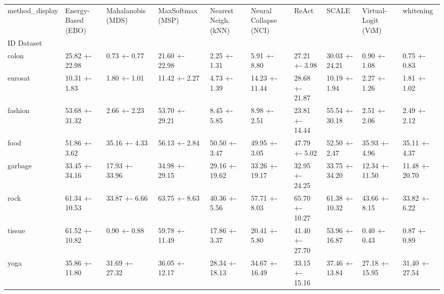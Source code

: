 \begin{tabular}{llllllllll}
\toprule
method_display & Energy-Based (EBO) & Mahalanobis (MDS) & MaxSoftmax (MSP) & Nearest Neigh. (kNN) & Neural Collapse (NCI) & ReAct & SCALE & Virtual-Logit (ViM) & whitening \\
ID Dataset &  &  &  &  &  &  &  &  &  \\
\midrule
colon & 25.82 +- 22.98 & 0.73 +- 0.77 & 21.60 +- 22.98 & 2.25 +- 1.31 & 5.91 +- 8.80 & 27.21 +- 3.98 & 30.03 +- 24.21 & 0.90 +- 1.08 & 0.75 +- 0.83 \\
eurosat & 10.31 +- 1.83 & 1.80 +- 1.01 & 11.42 +- 2.27 & 4.73 +- 1.39 & 14.23 +- 11.44 & 28.68 +- 21.87 & 10.19 +- 1.94 & 2.27 +- 1.26 & 1.81 +- 1.02 \\
fashion & 53.68 +- 31.32 & 2.66 +- 2.23 & 53.70 +- 29.21 & 8.45 +- 5.85 & 8.98 +- 2.51 & 23.81 +- 14.44 & 55.54 +- 30.18 & 2.51 +- 2.06 & 2.49 +- 2.12 \\
food & 51.86 +- 3.62 & 35.16 +- 4.33 & 56.13 +- 2.84 & 50.50 +- 3.47 & 49.95 +- 3.05 & 47.79 +- 5.02 & 52.50 +- 2.47 & 35.93 +- 4.96 & 35.11 +- 4.37 \\
garbage & 33.45 +- 34.16 & 17.93 +- 33.96 & 34.98 +- 29.15 & 29.16 +- 19.62 & 33.26 +- 19.17 & 32.95 +- 24.25 & 33.75 +- 34.20 & 12.34 +- 11.50 & 11.48 +- 20.70 \\
rock & 61.34 +- 10.53 & 33.87 +- 6.66 & 63.75 +- 8.63 & 40.36 +- 5.56 & 57.71 +- 8.03 & 65.70 +- 10.27 & 61.38 +- 10.32 & 43.66 +- 8.15 & 33.82 +- 6.22 \\
tissue & 61.52 +- 10.82 & 0.90 +- 0.88 & 59.78 +- 11.49 & 17.86 +- 3.37 & 20.41 +- 5.80 & 41.40 +- 27.70 & 53.96 +- 16.87 & 0.40 +- 0.43 & 0.87 +- 0.89 \\
yoga & 35.86 +- 11.80 & 31.69 +- 27.32 & 36.05 +- 12.17 & 28.34 +- 18.13 & 34.67 +- 16.49 & 33.15 +- 15.16 & 37.46 +- 13.84 & 27.18 +- 15.95 & 31.40 +- 27.54 \\
\bottomrule
\end{tabular}
